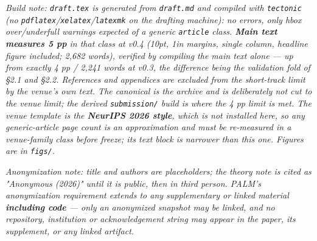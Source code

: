 \documentclass{article}
\begin{document}
\emph{Build note: \texttt{draft.tex} is generated from \texttt{draft.md} and compiled with \texttt{tectonic} (no \texttt{pdflatex}/\texttt{xelatex}/\texttt{latexmk} on the drafting machine): no errors, only hbox over/underfull warnings expected of a generic \texttt{article} class. \textbf{Main text measures 5 pp} in that class at v0.4 (10pt, 1in margins, single column, headline figure included; 2,682 words), verified by compiling the main text alone --- up from exactly 4 pp / 2,241 words at v0.3, the difference being the validation fold of \S 2.1 and \S 2.2. References and appendices are excluded from the short-track limit by the venue's own text. The canonical is the archive and is deliberately not cut to the venue limit; the derived \texttt{submission/} build is where the 4 pp limit is met. The venue template is the \textbf{NeurIPS 2026 style}, which is not installed here, so any generic-article page count is an approximation and must be re-measured in a venue-family class before freeze; its text block is narrower than this one. Figures are in \texttt{figs/}.}

\emph{Anonymization note: title and authors are placeholders; the theory note is cited as "Anonymous (2026)" until it is public, then in third person. PALM's anonymization requirement extends to any supplementary or linked material \textbf{including code} --- only an anonymized snapshot may be linked, and no repository, institution or acknowledgement string may appear in the paper, its supplement, or any linked artifact.}
\end{document}
